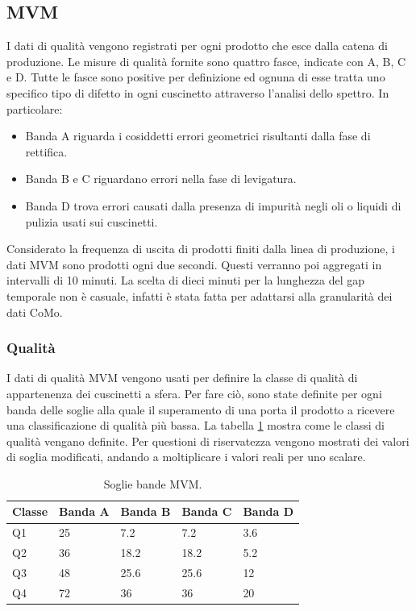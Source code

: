 \subsection{MVM}
I dati di qualità vengono registrati per ogni prodotto che esce dalla catena di produzione.
Le misure di qualità fornite sono quattro fasce, indicate con A, B, C e D.
Tutte le fasce sono positive per definizione ed ognuna di esse tratta uno specifico tipo di difetto in ogni cuscinetto attraverso l'analisi dello spettro. In particolare:
\begin{itemize}
	\item Banda A riguarda i cosiddetti errori geometrici risultanti dalla fase di rettifica.
	\item Banda B e C riguardano errori nella fase di levigatura.
	\item Banda D trova errori causati dalla presenza di impurità negli oli o liquidi di pulizia usati sui cuscinetti.
\end{itemize}

Considerato la frequenza di uscita di prodotti finiti dalla linea di produzione, i dati MVM sono prodotti ogni due secondi. Questi verranno poi aggregati in intervalli di 10 minuti. La scelta di dieci minuti per la lunghezza del gap temporale non è casuale, infatti è stata fatta per adattarsi alla granularità dei dati CoMo.

\subsubsection{Qualità}
I dati di qualità MVM vengono usati per definire la classe di qualità di appartenenza dei cuscinetti a sfera. Per fare ciò, sono state definite per ogni banda delle soglie alla quale il superamento di una porta il prodotto a ricevere una classificazione di qualità più bassa.
La tabella \ref{mvm-soglie} mostra come le classi di qualità vengano definite. Per questioni di riservatezza vengono mostrati dei valori di soglia modificati, andando a moltiplicare i valori reali per uno scalare.

\begin{table}
	\caption{\label{mvm-soglie}Soglie bande MVM.}
	\centering
	\begin{tabular}{|l|l|l|l|l|}
		\hline
		Classe & \multicolumn{1}{c|}{Banda A} & \multicolumn{1}{c|}{Banda B} & \multicolumn{1}{c|}{Banda C} & \multicolumn{1}{c|}{Banda D} \\ \hline
		Q1     & 25                           & 7.2                          & 7.2                          & 3.6                          \\ \hline
		Q2     & 36                           & 18.2                         & 18.2                         & 5.2                          \\ \hline
		Q3     & 48                           & 25.6                         & 25.6                         & 12                           \\ \hline
		Q4     & 72                           & 36                           & 36                           & 20                           \\ \hline
	\end{tabular}
\end{table}

